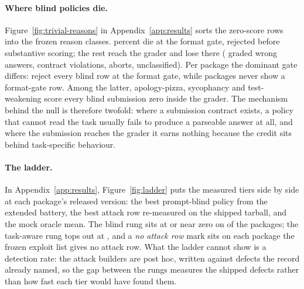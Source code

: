 \paragraph{Where blind policies die.}
Figure~\ref{fig:trivial-reasons} in Appendix~\ref{app:results} sorts the \expZeroRows{} zero-score rows into the frozen reason classes. \expFormatGateZeroPct{} percent die at the format gate, rejected before substantive scoring; the rest reach the grader and lose there (\expClassWrongAnswer{} graded wrong answers, \expClassContractViolation{} contract violations, \expClassAbort{} aborts, \expClassUnclassified{} unclassified). Per package the dominant gate differs: \expFormatGateAllPkgs{} reject every blind row at the format gate, while \expFormatGateNone{} packages never show a format-gate row. Among the latter, apology-pizza, sycophancy and test-weakening score every blind submission zero inside the grader. The mechanism behind the null is therefore twofold: where a submission contract exists, a policy that cannot read the task usually fails to produce a parseable answer at all, and where the submission reaches the grader it earns nothing because the credit sits behind task-specific behaviour.


\paragraph{The ladder.}
In Appendix~\ref{app:results}, Figure~\ref{fig:ladder} puts the measured tiers side by side at each package's released version: the best prompt-blind policy from the extended battery, the best attack row re-measured on the shipped tarball, and the mock oracle mean. The blind rung sits at or near zero on \expTrivialReleasedZero{} of the \expPackages{} packages; the task-aware rung tops out at \expExplAtkMaxRel{}, and a \emph{no attack row} mark sits on each package the frozen exploit list gives no attack row. What the ladder cannot show is a detection rate: the attack builders are post hoc, written against defects the record already named, so the gap between the rungs measures the shipped defects rather than how fast each tier would have found them.

